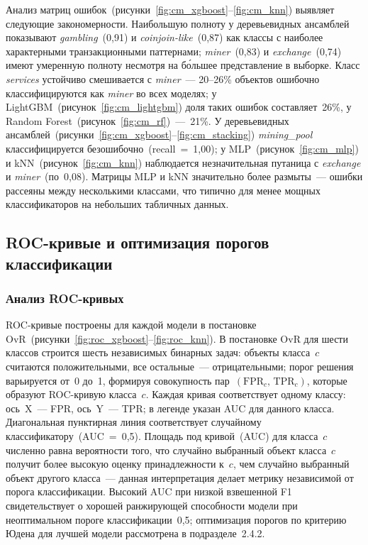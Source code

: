Анализ матриц ошибок~(рисунки~\ref{fig:cm_xgboost}--\ref{fig:cm_knn}) выявляет следующие закономерности. Наибольшую полноту у деревьевидных ансамблей показывают \textit{gambling}~(0,91) и \textit{coinjoin-like}~(0,87) как классы с наиболее характерными транзакционными паттернами; \textit{miner}~(0,83) и \textit{exchange}~(0,74) имеют умеренную полноту несмотря на бо́льшее представление в выборке. Класс \textit{services} устойчиво смешивается с \textit{miner}~--- 20--26\% объектов ошибочно классифицируются как \textit{miner} во всех моделях; у LightGBM~(рисунок~\ref{fig:cm_lightgbm}) доля таких ошибок составляет~26\%, у Random Forest~(рисунок~\ref{fig:cm_rf})~---~21\%. У деревьевидных ансамблей~(рисунки~\ref{fig:cm_xgboost}--\ref{fig:cm_stacking}) \textit{mining\_pool} классифицируется безошибочно~(recall~=~1,00); у MLP~(рисунок~\ref{fig:cm_mlp}) и kNN~(рисунок~\ref{fig:cm_knn}) наблюдается незначительная путаница с \textit{exchange} и \textit{miner}~(по~0,08). Матрицы MLP и kNN значительно более размыты~--- ошибки рассеяны между несколькими классами, что типично для менее мощных классификаторов на небольших табличных данных.

\subsection{ROC-кривые и оптимизация порогов классификации}

\subsubsection{Анализ ROC-кривых}

ROC-кривые построены для каждой модели в постановке OvR~(рисунки~\ref{fig:roc_xgboost}--\ref{fig:roc_knn}). В постановке OvR для шести классов строится шесть независимых бинарных задач: объекты класса~$c$ считаются положительными, все остальные~--- отрицательными; порог решения варьируется от~0 до~1, формируя совокупность пар~$(\text{FPR}_c,\,\text{TPR}_c)$, которые образуют ROC-кривую класса~$c$. Каждая кривая соответствует одному классу: ось~X~--- FPR, ось~Y~--- TPR; в легенде указан AUC для данного класса. Диагональная пунктирная линия соответствует случайному классификатору~(AUC~=~0,5). Площадь под кривой~(AUC) для класса~$c$ численно равна вероятности того, что случайно выбранный объект класса~$c$ получит более высокую оценку принадлежности к~$c$, чем случайно выбранный объект другого класса~--- данная интерпретация делает метрику независимой от порога классификации. Высокий AUC при низкой взвешенной F1 свидетельствует о хорошей ранжирующей способности модели при неоптимальном пороге классификации~0,5; оптимизация порогов по критерию Юдена для лучшей модели рассмотрена в подразделе~2.4.2.

